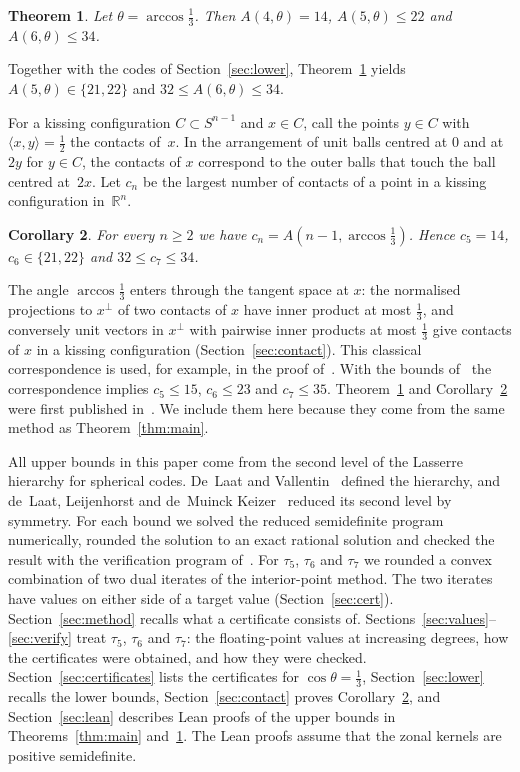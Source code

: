 \documentclass[11pt]{amsart}
\newtheorem{theorem}{Theorem}[section]
\newtheorem{corollary}[theorem]{Corollary}
\theoremstyle{remark}
\newcommand{\R}{\mathbb{R}}
\begin{document}
\begin{theorem}\label{thm:cos13}
Let $\theta=\arccos\frac13$. Then $A(4,\theta)=14$, $A(5,\theta)\le22$ and $A(6,\theta)\le34$.
\end{theorem}

Together with the codes of Section~\ref{sec:lower}, Theorem~\ref{thm:cos13} yields $A(5,\theta)\in\{21,22\}$ and $32\le A(6,\theta)\le 34$.

For a kissing configuration $C\subset S^{n-1}$ and $x\in C$, call the points $y\in C$ with $\langle x,y\rangle=\frac12$ the contacts of~$x$. In the arrangement of unit balls centred at $0$ and at $2y$ for $y\in C$, the contacts of $x$ correspond to the outer balls that touch the ball centred at~$2x$. Let $c_n$ be the largest number of contacts of a point in a kissing configuration in~$\R^n$.

\begin{corollary}\label{cor:contact}
For every $n\ge2$ we have $c_n=A(n-1,\arccos\frac13)$. Hence $c_5=14$, $c_6\in\{21,22\}$ and $32\le c_7\le 34$.
\end{corollary}

The angle $\arccos\frac13$ enters through the tangent space at $x$: the normalised projections to $x^\perp$ of two contacts of $x$ have inner product at most $\frac13$, and conversely unit vectors in $x^\perp$ with pairwise inner products at most $\frac13$ give contacts of $x$ in a kissing configuration (Section~\ref{sec:contact}). This classical correspondence is used, for example, in the proof of~\cite[Theorem~4.2]{DdLM}. With the bounds of~\cite{BV} the correspondence implies $c_5\le15$, $c_6\le23$ and $c_7\le35$. Theorem~\ref{thm:cos13} and Corollary~\ref{cor:contact} were first published in~\cite{cos13}. We include them here because they come from the same method as Theorem~\ref{thm:main}.

All upper bounds in this paper come from the second level of the Lasserre hierarchy for spherical codes. De~Laat and Vallentin~\cite{dLV} defined the hierarchy, and de~Laat, Leijenhorst and de~Muinck Keizer~\cite{LLM} reduced its second level by symmetry. For each bound we solved the reduced semidefinite program numerically, rounded the solution to an exact rational solution and checked the result with the verification program of~\cite{LLM}. For $\tau_5$, $\tau_6$ and $\tau_7$ we rounded a convex combination of two dual iterates of the interior-point method. The two iterates have values on either side of a target value (Section~\ref{sec:cert}). Section~\ref{sec:method} recalls what a certificate consists of. Sections~\ref{sec:values}--\ref{sec:verify} treat $\tau_5$, $\tau_6$ and $\tau_7$: the floating-point values at increasing degrees, how the certificates were obtained, and how they were checked. Section~\ref{sec:certificates} lists the certificates for $\cos\theta=\frac13$, Section~\ref{sec:lower} recalls the lower bounds, Section~\ref{sec:contact} proves Corollary~\ref{cor:contact}, and Section~\ref{sec:lean} describes Lean proofs of the upper bounds in Theorems~\ref{thm:main} and~\ref{thm:cos13}. The Lean proofs assume that the zonal kernels are positive semidefinite.
\end{document}
